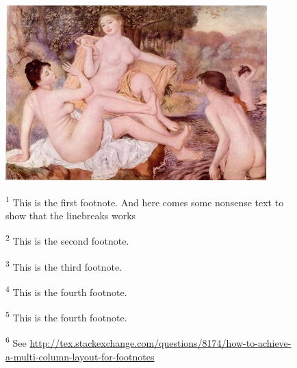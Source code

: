 \begin{figure}
\centering

\includegraphics[height=0.5\textheight, width=0.9\textwidth, keepaspectratio]{./images/bathers-01.png}
\vspace{3\baselineskip}
\footnoterule\footnotesize
\begin{minipage}[t]{0.49\linewidth}
\textsuperscript{1} This is the first footnote. And here comes some nonsense text
                    to show that the linebreaks works \par
\textsuperscript{2} This is the second footnote.\par
\end{minipage}\hfill
\begin{minipage}[t]{0.49\linewidth}
\textsuperscript{3} This is the third footnote. \par
\textsuperscript{4} This is the fourth footnote.\par
\textsuperscript{5} This is the fourth footnote.\par
\textsuperscript{6} See \url{http://tex.stackexchange.com/questions/8174/how-to-achieve-a-multi-column-layout-for-footnotes}\par
\end{minipage}
\end{figure}


